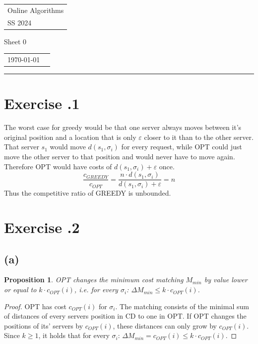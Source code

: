 \documentclass[a4paper,12pt]{scrartcl}
\newcommand{\mal}{\ensuremath{\cdot}}
\newcounter{sheet}
\newcommand{\printsheet}{\arabic{sheet}}
\newcommand{\printmembers}{}
\newtheorem{proposition}{Proposition}[sheet]
\begin{document}
{\raggedright
\begin{tabular}{l}
    Online Algorithms \\
    SS 2024 \\
\end{tabular}}
\hfill
{\Large Sheet 0\printsheet}
\hfill
\begin{tabular}{l l}
\today{} \\
\printmembers
\end{tabular}
\hrule



\section*{Exercise \printsheet.1}
The worst case for greedy would be that one server always moves between it's original position and a location that is only $\varepsilon$ closer to it than to the other server. That server $s_1$ would move $d(s_1,\sigma_i)$ for every request, while OPT could just move the other server to that position and would never have to move again. Therefore OPT would have costs of $d(s_1,\sigma_i)+\varepsilon$ once.
\[\frac{c_{GREEDY}}{c_{OPT}} = \frac{n\mal d(s_1,\sigma_i)}{d(s_1,\sigma_i)+\varepsilon} = n\]
Thus the competitive ratio of GREEDY is unbounded. 


\section*{Exercise \printsheet.2}
\subsection*{(a)}
\begin{proposition}
OPT changes the minimum cost matching $M_{min}$ by value lower or equal to $k \mal c_{OPT}(i)$, i.e. for every $\sigma_i$: $\Delta M_{min} \leq k \mal c_{OPT}(i)$.
\end{proposition}
\begin{proof}
OPT has cost $c_{OPT}(i)$ for $\sigma_i$. The matching consists of the minimal sum of distances of every servers position in CD to one in OPT. If OPT changes the positions of its' servers by $c_{OPT}(i)$, these distances can only grow by $c_{OPT}(i)$. Since $k \geq 1$, it holds that for every $\sigma_i$: $\Delta M_{min} = c_{OPT}(i) \leq k \mal c_{OPT}(i)$. \end{proof}

\pagebreak
\end{document}
